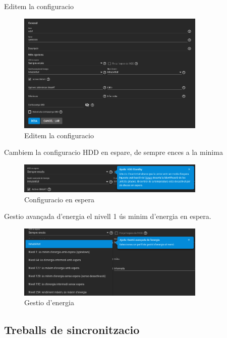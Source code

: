 \documentclass[
  10pt,
]{krantz}
\begin{document}
Editem la configuracio

\begin{figure}
\centering
\includegraphics[width=0.8\textwidth,height=\textheight]{imatges/proxmox/Conf_disc_ener2.png}
\caption{Editem la configuracio}
\end{figure}

Cambiem la configuracio HDD en espare, de sempre ences a la minima

\begin{figure}
\centering
\includegraphics[width=0.8\textwidth,height=\textheight]{imatges/proxmox/Conf_disc_ener3.png}
\caption{Configuracio en espera}
\end{figure}

Gestio avançada d'energia el nivell 1 ús minim d'energia en espera.

\begin{figure}
\centering
\includegraphics[width=0.8\textwidth,height=\textheight]{imatges/proxmox/Conf_disc_ener4.png}
\caption{Gestio d'energia}
\end{figure}

\hypertarget{treballs-de-sincronitzacio}{%
\subsection{Treballs de sincronitzacio}\label{treballs-de-sincronitzacio}}
\end{document}
